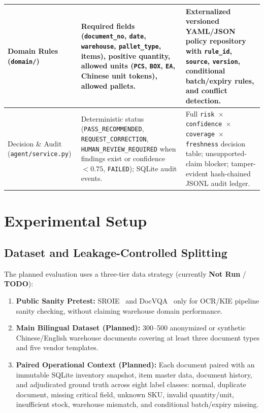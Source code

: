 \documentclass[conference]{IEEEtran}
\begin{document}
\begin{table}[t]
\begin{tabular}{|>{\raggedright\arraybackslash}p{2.4cm}|>{\raggedright\arraybackslash}p{6.6cm}|>{\raggedright\arraybackslash}p{7.1cm}|}
\hline
Domain Rules (\texttt{domain/}) & Required fields (\texttt{document\_\allowbreak no}, \texttt{date}, \texttt{warehouse}, \texttt{pallet\_\allowbreak type}, items), positive quantity, allowed units (\texttt{PCS}, \texttt{BOX}, \texttt{EA}, Chinese unit tokens), allowed pallets. & Externalized versioned YAML/JSON policy repository with \texttt{rule\_\allowbreak id}, \texttt{source}, \texttt{version}, conditional batch/expiry rules, and conflict detection. \\
\hline
Decision \& Audit (\texttt{agent/\allowbreak service.py}) & Deterministic status (\texttt{PASS\_\allowbreak RECOMMENDED}, \texttt{REQUEST\_\allowbreak CORRECTION}, \texttt{HUMAN\_\allowbreak REVIEW\_\allowbreak REQUIRED} when findings exist or confidence $< 0.75$, \texttt{FAILED}); SQLite audit events. & Full \texttt{risk $\times$ confidence $\times$ coverage $\times$ freshness} decision table; unsupported-claim blocker; tamper-evident hash-chained JSONL audit ledger. \\
\hline
\end{tabular}
\end{table}

\section{Experimental Setup}

\subsection{Dataset and Leakage-Controlled Splitting}
The planned evaluation uses a three-tier data strategy (currently \textbf{Not Run} / \textbf{TODO}):
\begin{enumerate}
    \item \textbf{Public Sanity Pretest:} SROIE~\cite{b4} and DocVQA~\cite{b5} only for OCR/KIE pipeline sanity checking, without claiming warehouse domain performance.
    \item \textbf{Main Bilingual Dataset (Planned):} 300--500 anonymized or synthetic Chinese/English warehouse documents covering at least three document types and five vendor templates.
    \item \textbf{Paired Operational Context (Planned):} Each document paired with an immutable SQLite inventory snapshot, item master data, document history, and adjudicated ground truth across eight label classes: normal, duplicate document, missing critical field, unknown SKU, invalid quantity/unit, insufficient stock, warehouse mismatch, and conditional batch/expiry missing.
\end{enumerate}
\end{document}
